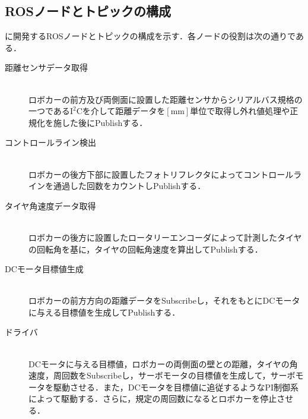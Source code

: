 \newpage
\subsection{ROSノードとトピックの構成}
に開発するROSノードとトピックの構成を示す．各ノードの役割は次の通りである．
\begin{description}

    \item[距離センサデータ取得] \mbox{} \\
      ロボカーの前方及び両側面に設置した距離センサからシリアルバス規格の一つである$\mathrm{I^2C}$を介して距離データを$\mathrm{[mm]}$単位で取得し外れ値処理や正規化を施した後にPublishする．
    \item[コントロールライン検出] \mbox{} \\
      ロボカーの後方下部に設置したフォトリフレクタによってコントロールラインを通過した回数をカウントしPublishする．

    \item[タイヤ角速度データ取得] \mbox{} \\
      ロボカーの後方に設置したロータリーエンコーダによって計測したタイヤの回転角を基に，タイヤの回転角速度を算出してPublishする．

    \item[DCモータ目標値生成] \mbox{} \\
      ロボカーの前方方向の距離データをSubscribeし，それをもとにDCモータに与える目標値を生成してPublishする．

    \item[ドライバ] \mbox{} \\
      DCモータに与える目標値，ロボカーの両側面の壁との距離，タイヤの角速度，周回数をSubscribeし，サーボモータの目標値を生成して，サーボモータを駆動させる．また，DCモータを目標値に追従するようなPI制御系によって駆動する．さらに，規定の周回数になるとロボカーを停止させる．


  \end{description}
